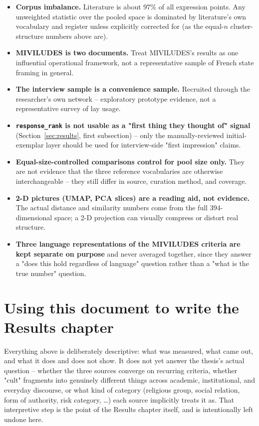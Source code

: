 \documentclass[11pt,a4paper]{article}
\begin{document}
\begin{itemize}[leftmargin=1.4em]
  \item \textbf{Corpus imbalance.} Literature is about 97\% of all
  expression points. Any unweighted statistic over the pooled space is
  dominated by literature's own vocabulary and register unless
  explicitly corrected for (as the equal-$n$ cluster-structure numbers
  above are).
  \item \textbf{MIVILUDES is two documents.} Treat MIVILUDES's results
  as one influential operational framework, not a representative sample
  of French state framing in general.
  \item \textbf{The interview sample is a convenience sample.}
  Recruited through the researcher's own network -- exploratory
  prototype evidence, not a representative survey of lay usage.
  \item \textbf{\texttt{response\_rank} is not usable as a
  "first thing they thought of" signal} (Section~\ref{sec:results},
  first subsection) -- only the manually-reviewed initial-exemplar
  layer should be used for interview-side "first impression" claims.
  \item \textbf{Equal-size-controlled comparisons control for pool size
  only.} They are not evidence that the three reference vocabularies
  are otherwise interchangeable -- they still differ in source,
  curation method, and coverage.
  \item \textbf{2-D pictures (UMAP, PCA slices) are a reading aid, not
  evidence.} The actual distance and similarity numbers come from the
  full 394-dimensional space; a 2-D projection can visually compress or
  distort real structure.
  \item \textbf{Three language representations of the MIVILUDES criteria
  are kept separate on purpose} and never averaged together, since they
  answer a "does this hold regardless of language" question rather than
  a "what is the true number" question.
\end{itemize}

\section{Using this document to write the Results chapter}

Everything above is deliberately descriptive: what was measured, what
came out, and what it does and does not show. It does not yet answer the
thesis's actual question -- whether the three sources converge on
recurring criteria, whether "cult" fragments into genuinely different
things across academic, institutional, and everyday discourse, or what
kind of category (religious group, social relation, form of authority,
risk category, \ldots) each source implicitly treats it as. That
interpretive step is the point of the Results chapter itself, and is
intentionally left undone here.
\end{document}
